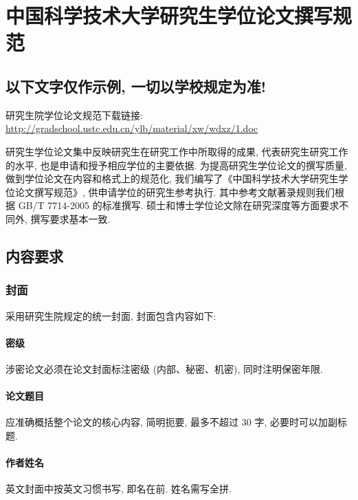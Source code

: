 ﻿\chapter{中国科学技术大学研究生学位论文撰写规范}
\label{chap:requires}
\section*{以下文字仅作示例, 一切以学校规定为准!}
研究生院学位论文规范下载链接:\\
\url{http://gradschool.ustc.edu.cn/ylb/material/xw/wdxz/1.doc}

\bigskip

研究生学位论文集中反映研究生在研究工作中所取得的成果, 代表研究生研究工作的水平, 也是申请和授予相应学位的主要依据. 为提高研究生学位论文的撰写质量, 做到学位论文在内容和格式上的规范化, 我们编写了《中国科学技术大学研究生学位论文撰写规范》, 供申请学位的研究生参考执行. 其中参考文献著录规则我们根据 GB/T 7714-2005 的标准撰写. 硕士和博士学位论文除在研究深度等方面要求不同外, 撰写要求基本一致.

\section{内容要求}

\subsection{封面}

采用研究生院规定的统一封面, 封面包含内容如下:

\subsubsection{密级}

涉密论文必须在论文封面标注密级 (内部、秘密、机密), 同时注明保密年限.

\subsubsection{论文题目}

应准确概括整个论文的核心内容, 简明扼要, 最多不超过 30 字, 必要时可以加副标题.

\subsubsection{作者姓名}

英文封面中按英文习惯书写, 即名在前. 姓名需写全拼.

